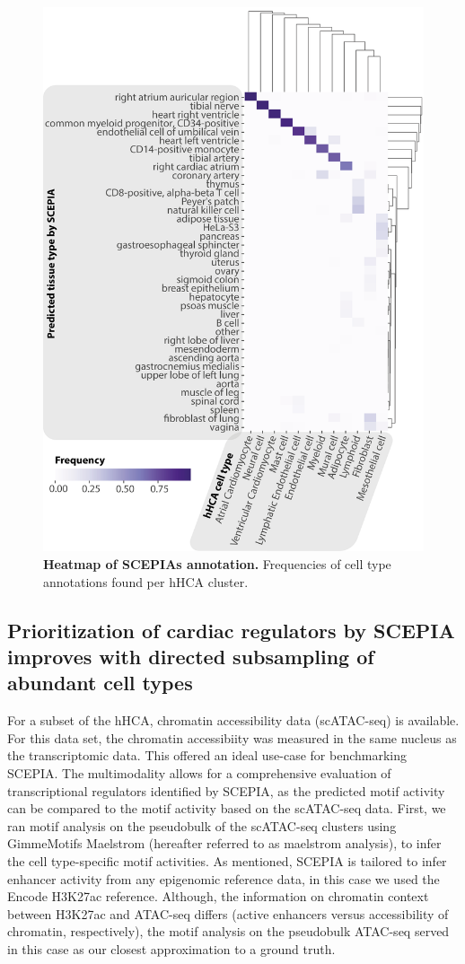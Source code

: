 \begin{figure}
    \centering
    \includegraphics[width=0.75\linewidth]{ch.scepia/imgs/SCEPIA Annotation Heatmap All Cells 40deg Rotated Figure 4.png}
    \caption{\textbf{Heatmap of SCEPIAs annotation.} Frequencies of cell type annotations found per hHCA cluster.}
    \label{fig:scepia_annohm}
\end{figure}

\subsection{Prioritization of cardiac regulators by SCEPIA improves with directed subsampling of abundant cell types}

For a subset of the hHCA, chromatin accessibility data (scATAC-seq) is available. For this data set, the chromatin accessibiity was measured in the same nucleus as the transcriptomic data. This offered an ideal use-case for benchmarking SCEPIA. The multimodality allows for a comprehensive evaluation of transcriptional regulators identified by SCEPIA, as the predicted motif activity can be compared to the motif activity based on the scATAC-seq data. First, we ran motif analysis on the pseudobulk of the scATAC-seq clusters using GimmeMotifs Maelstrom\cite{Bruse_2018} (hereafter referred to as maelstrom analysis), to infer the cell type-specific motif activities. As mentioned, SCEPIA is tailored to infer enhancer activity from any epigenomic reference data, in this case we used the Encode H3K27ac reference. Although, the information on chromatin context between H3K27ac and ATAC-seq differs (active enhancers versus accessibility of chromatin, respectively), the motif analysis on the pseudobulk ATAC-seq served in this case as our closest approximation to a ground truth. 

